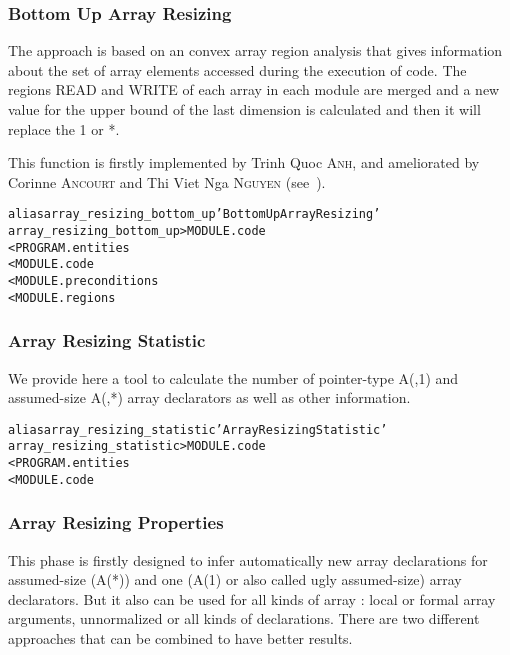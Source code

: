 \documentclass[a4paper]{report}
\newenvironment{PipsMake}{\begin{alltt}}{\end{alltt}}
\newenvironment{PipsPass}[1]{\label{pass:#1}}{}
\begin{document}
\subsubsection{Bottom Up Array Resizing}

\begin{PipsPass}{array_resizing_bottom_up}

The approach is based on an convex array region analysis that gives
  information about the set of array elements accessed during the
  execution of code. The regions READ and WRITE of each
array in each module are merged and a new value for the upper bound of the last
dimension is calculated and then it will replace the 1 or *.

This function is firstly implemented by Trinh Quoc \textsc{Anh}, and
ameliorated by Corinne \textsc{Ancourt} and Thi Viet Nga \textsc{Nguyen} (see~\cite{Ngu02}).
\end{PipsPass}

\begin{PipsMake}
alias array_resizing_bottom_up 'Bottom Up Array Resizing'
array_resizing_bottom_up         > MODULE.code
        < PROGRAM.entities
        < MODULE.code
        < MODULE.preconditions
        < MODULE.regions
\end{PipsMake}

\subsubsection{Array Resizing Statistic}

We provide here a tool to calculate the number of pointer-type A(,1) and
assumed-size A(,*) array declarators as well as other information.

\begin{PipsMake}
alias array_resizing_statistic 'Array Resizing Statistic'
array_resizing_statistic   > MODULE.code
        < PROGRAM.entities
        < MODULE.code
\end{PipsMake}

\subsubsection{Array Resizing Properties}

This phase is firstly designed to infer automatically new array
declarations for assumed-size (A(*)) and one (A(1) or also called ugly
assumed-size) array declarators. But
it also can be used for all kinds of array : local or formal array
arguments, unnormalized or all kinds of declarations. There are two
different approaches that can be combined to have better results.
\end{document}

